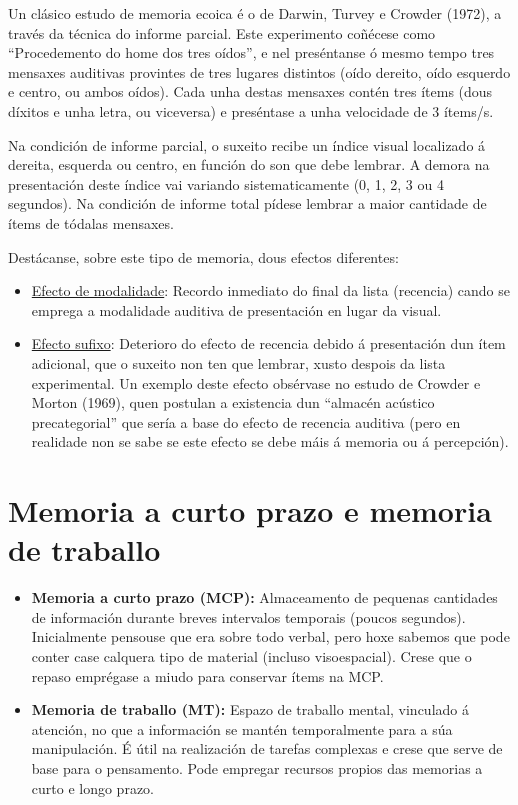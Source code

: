 \documentclass[a4paper,11pt]{article}
\begin{document}
Un clásico estudo de memoria ecoica é o de Darwin, Turvey e Crowder (1972), a través da técnica do informe parcial. Este experimento coñécese como ``Procedemento do home dos tres oídos'', e nel preséntanse ó mesmo tempo tres mensaxes auditivas provintes de tres lugares distintos (oído dereito, oído esquerdo e centro, ou ambos oídos). Cada unha destas mensaxes contén tres ítems (dous díxitos e unha letra, ou viceversa) e preséntase a unha velocidade de 3 ítems/s. 

Na condición de informe parcial, o suxeito recibe un índice visual localizado á dereita, esquerda ou centro, en función do son que debe lembrar. A demora na presentación deste índice vai variando sistematicamente (0, 1, 2, 3 ou 4 segundos). Na condición de informe total pídese lembrar a maior cantidade de ítems de tódalas mensaxes. 

Destácanse, sobre este tipo de memoria, dous efectos diferentes:
\begin{itemize}
	\item \underline{Efecto de modalidade}: Recordo inmediato do final da lista (recencia) cando se 		emprega a modalidade auditiva de presentación en lugar da visual. 
	\item \underline{Efecto sufixo}: Deterioro do efecto de recencia debido á presentación dun ítem 		adicional, que o suxeito non ten que lembrar, xusto despois da lista experimental. Un exemplo 			deste efecto obsérvase no estudo de Crowder e Morton (1969), quen postulan a existencia dun 			``almacén acústico precategorial'' que sería a base do efecto de recencia auditiva (pero en 			realidade non se sabe se este efecto se debe máis á memoria ou á percepción).
\end{itemize}

\section{Memoria a curto prazo e memoria de traballo}
\begin{itemize}
	\item \textbf{Memoria a curto prazo (MCP):} Almaceamento de pequenas cantidades de información 			durante breves intervalos temporais (poucos segundos). Inicialmente pensouse que era sobre todo 		verbal, pero hoxe sabemos que pode conter case calquera tipo de material (incluso visoespacial). 		Crese que o repaso emprégase a miudo para conservar ítems na MCP. 
	\item \textbf{Memoria de traballo (MT):} Espazo de traballo mental, vinculado á atención, no que 		a información se mantén temporalmente para a súa manipulación. É útil na realización de tarefas 		complexas e crese que serve de base para o pensamento. Pode empregar recursos propios das 				memorias a curto e longo prazo.
\end{itemize}
 
\end{document}
